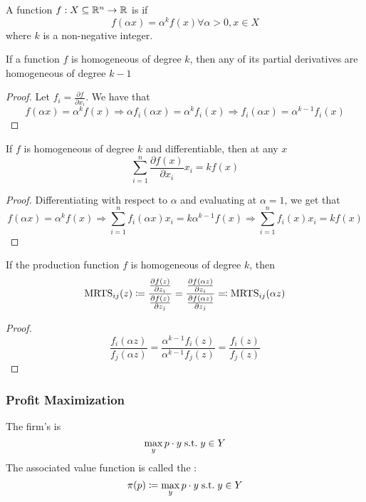 \documentclass[12pt]{article}
\begin{document}
\begin{definition}
	A function $f: X \subseteq \mathbb{R}^n \to \mathbb{R}$ is  if
	\[
	f(\alpha x) = \alpha^k f(x) \forall \alpha > 0, x \in X
	\]
	where $k$ is a non-negative integer.
\end{definition}
\begin{proposition}
	If a function $f$ is homogeneous of degree $k$, then any of its partial derivatives are homogeneous of degree $k-1$
\end{proposition}
\begin{proof}
	Let $f_i = \frac{\partial f}{\partial x_i}$. We have that
	\[
	f(\alpha x) = \alpha^k f(x) \Longrightarrow \alpha f_i(\alpha x) = \alpha^k f_i(x) \Longrightarrow f_i(\alpha x) = \alpha^{k-1}f_i(x)
	\]
\end{proof}

\begin{proposition}
	 If $f$ is homogeneous of degree $k$ and differentiable, then at any $x$
	\[
	\sum_{i=1}^n \frac{\partial f(x)}{\partial x_i}x_i = kf(x)
	\]
\end{proposition}
\begin{proof}
	Differentiating with respect to $\alpha$ and evaluating at $\alpha = 1$, we get that
	\[
	f(\alpha x) = \alpha^k f(x) \Longrightarrow \sum_{i=1}^n f_i(\alpha x) x_i = k\alpha^{k-1}f(x) \Longrightarrow \sum_{i=1}^n f_i(x)x_i = kf(x)
	\]
\end{proof}

\begin{proposition}
	If the production function $f$ is homogeneous of degree $k$, then
	\[
	\textnormal{MRTS}_{ij}(z) \coloneqq \frac{\frac{\partial f(z)}{\partial z_i}}{\frac{\partial f(z)}{\partial z_j}} = \frac{\frac{\partial f(\alpha z)}{\partial z_i}}{\frac{\partial f(\alpha z)}{\partial z_j}} \eqqcolon \textnormal{MRTS}_{ij}(\alpha z)
	\]
\end{proposition}
\begin{proof}
	\[
	\frac{f_i(\alpha z)}{f_j(\alpha z)} = \frac{\alpha^{k-1}f_i(z)}{\alpha^{k-1}f_j( z)} = \frac{f_i(z)}{f_j(z)}
	\]
\end{proof}

\subsubsection{Profit Maximization}

\begin{definition}
	The firm's  is
	\[
	\max_y p \cdot y \;\text{s.t.}\; y \in Y
	\]
	The associated value function is called the :
	\[
	\pi(p) \coloneqq \max_y p \cdot y \;\text{s.t.}\; y \in Y
	\]
\end{definition}
\end{document}

